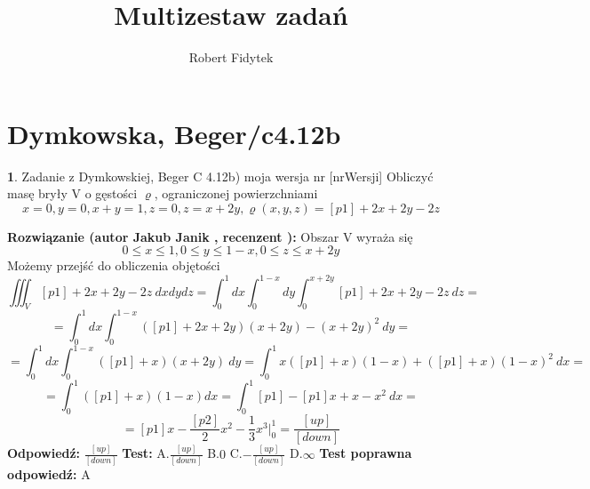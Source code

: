 \documentclass[12pt, a4paper]{article}
\title{Multizestaw zadań}
\author{Robert Fidytek}
\date{}
\theoremstyle{definition} %
\newtheorem{zad}{}
\newcommand{\kategoria}[1]{\section{#1}} %
\newcommand{\zadStart}[1]{\begin{zad}#1\newline} %
\newcommand{\zadStop}{\end{zad}}   %
\newcommand{\rozwStart}[2]{\noindent \textbf{Rozwiązanie (autor #1 , recenzent #2): }\newline} %
\newcommand{\rozwStop}{\newline}                                            %
\newcommand{\odpStart}{\noindent \textbf{Odpowiedź:}\newline}    %
\newcommand{\odpStop}{\newline}                                             %
\newcommand{\testStart}{\noindent \textbf{Test:}\newline} %
\newcommand{\testStop}{\newline} %
\newcommand{\kluczStart}{\noindent \textbf{Test poprawna odpowiedź:}\newline} %
\newcommand{\kluczStop}{\newline} %
\begin{document}
\maketitle


\kategoria{Dymkowska, Beger/c4.12b}
\zadStart{Zadanie z Dymkowskiej, Beger C 4.12b) moja wersja nr [nrWersji]}
Obliczyć masę bryły V o gęstości $\varrho$, ograniczonej powierzchniami
$$x=0, y=0, x+y=1, z=0, z=x+2y, \varrho(x,y,z)=[p1]+2x+2y-2z$$
\zadStop
\rozwStart{Jakub Janik}{}
Obszar V wyraża się $$0 \leq x \leq 1, 0 \leq y \leq 1-x, 0 \leq z \leq x+2y$$
Możemy przejść do obliczenia objętości
$$\iiint_V [p1]+2x+2y-2z\ dxdydz=\int_0^1dx\int_0^{1-x}dy\int_0^{x+2y}[p1]+2x+2y-2z\ dz=$$
$$=\int_0^1dx\int_0^{1-x}([p1]+2x+2y)(x+2y)-(x+2y)^2\ dy=$$
$$=\int_0^1dx\int_0^{1-x}([p1]+x)(x+2y)\ dy=\int_0^1 x([p1]+x)(1-x)+([p1]+x)(1-x)^2\ dx=$$
$$=\int_0^1([p1]+x)(1-x)dx=\int_0^1 [p1]-[p1]x+x-x^2\ dx=$$
$$=[p1]x-\frac{[p2]}{2}x^2-\frac{1}{3}x^3\Big|_0^1=\frac{[up]}{[down]}$$
\rozwStop
\odpStart
$\frac{[up]}{[down]}$
\odpStop
\testStart
A.$\frac{[up]}{[down]}$
B.$0$
C.$-\frac{[up]}{[down]}$
D.$\infty$
\testStop
\kluczStart
A
\kluczStop
\end{document}
